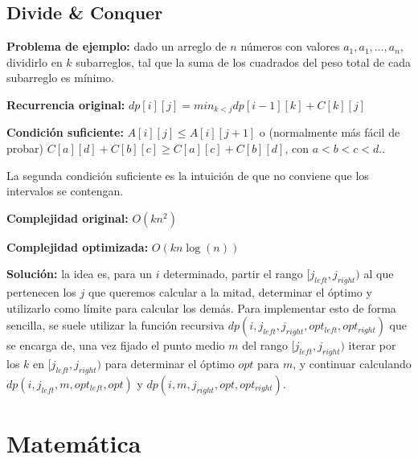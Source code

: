 \subsection{Divide \& Conquer}
{
    \textbf{Problema de ejemplo:} dado un arreglo de $n$ números con valores $a_1, a_1, \dots, a_n$, dividirlo
    en $k$ subarreglos, tal que la suma de los cuadrados del peso total de cada subarreglo es mínimo.

    \textbf{Recurrencia original:} $dp[i][j] = min_{k < j}{dp[i - 1][k] + C[k][j]}$ 

    \textbf{Condición suficiente:} $ A[i][j] \leq A[i][j + 1] $ o (normalmente más fácil de probar) 
    $ C[a][d] + C[b][c] \geq C[a][c] + C[b][d]$, con $a < b < c < d. $.

    La segunda condición suficiente es la intuición de que no conviene que los intervalos se contengan.

    \textbf{Complejidad original:} $O(kn^2)$

    \textbf{Complejidad optimizada:} $O(kn\log(n))$

    \textbf{Solución:} la idea es, para un $i$ determinado, partir el rango $[j_{left}, j_{right})$ al que pertenecen 
    los $j$ que queremos calcular a la mitad, determinar el óptimo y utilizarlo como límite para calcular los demás.
    Para implementar esto de forma sencilla, se suele utilizar la función recursiva $dp(i, j_{left}, j_{right}, opt_{left}, opt_{right})$
    que se encarga de, una vez fijado el punto medio $m$ del rango $[j_{left}, j_{right})$ iterar por los $k$ en $[j_{left}, j_{right})$ 
    para determinar el óptimo $opt$ para $m$, y continuar calculando $dp(i, j_{left}, m, opt_{left}, opt)$ y 
    $dp(i, m, j_{right}, opt, opt_{right})$.

}

\section{Matemática}%
